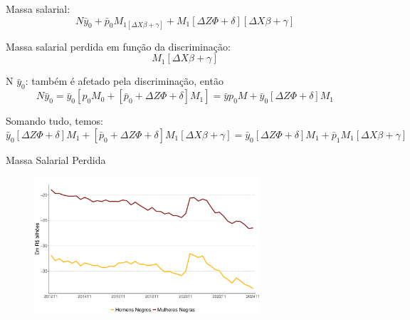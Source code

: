 \documentclass[10pt, xcolor=x11names,compress]{beamer}
\begin{document}
\begin{frame}
	Massa salarial: 
	\begin{equation}
	N\bar{y}_{0} + \bar{p}_{0}M_{1[\Delta X\beta + \gamma ]} + M_{1}[\Delta Z\Phi + \delta][\Delta X\beta + \gamma]
	\end{equation}
	
	Massa salarial perdida em função da discriminação:
	\begin{equation}
		[\bar{p}_{0} + \Delta Z \Phi + \delta] M_{1}[\Delta X\beta + \gamma]
	\end{equation}
	
		N $\bar{y}_{0}$: também é afetado pela discriminação, então
		\begin{equation}
		N\bar{y}_{0} = \bar{y}_{0}[p_{0}M_{0} + [\bar{p}_{0} + \Delta Z\Phi + \delta]M_{1}] = \bar{y}p_{0}M + \bar{y}_{0}[\Delta Z\Phi + \delta]M_1
		\end{equation}
		
	Somando tudo, temos:
	\begin{equation}
	\bar{y}_{0}[\Delta Z\Phi + \delta]M_1 + [\bar{p}_{0} + \Delta Z\Phi + \delta]M_{1}[\Delta X\beta + \gamma] = \bar{y}_{0}[\Delta Z\Phi + \delta]M_1 + \bar{p}_{1}M_{1}[\Delta X\beta + \gamma]
	\end{equation}	
    \end{frame}
    
    	\begin{frame}{Massa Salarial Perdida}
    	\begin{figure}
    		\centering
    		\includegraphics[width = 0.75\textwidth]{figures_output/massa_salarial_perdida_genero_raca.pdf}
    	\end{figure}
    \end{frame}
    
\end{document}
